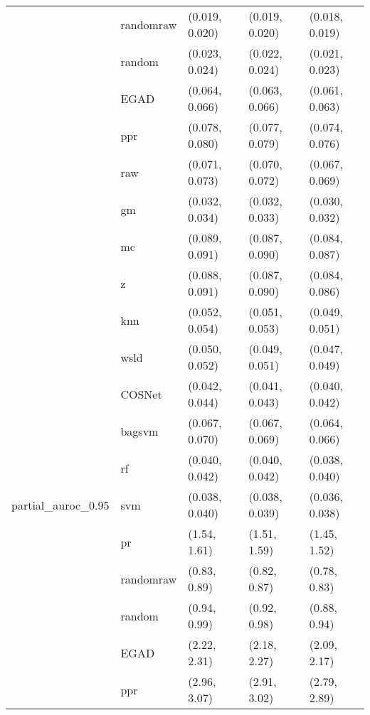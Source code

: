 \begin{table}[H]
{\begin{tabular}{lllll}
 & randomraw & (0.019, 0.020) & (0.019, 0.020) & (0.018, 0.019)\\

 & random & (0.023, 0.024) & (0.022, 0.024) & (0.021, 0.023)\\

 & EGAD & (0.064, 0.066) & (0.063, 0.066) & (0.061, 0.063)\\

 & ppr & (0.078, 0.080) & (0.077, 0.079) & (0.074, 0.076)\\

 & raw & (0.071, 0.073) & (0.070, 0.072) & (0.067, 0.069)\\

 & gm & (0.032, 0.034) & (0.032, 0.033) & (0.030, 0.032)\\

 & mc & (0.089, 0.091) & (0.087, 0.090) & (0.084, 0.087)\\

 & z & (0.088, 0.091) & (0.087, 0.090) & (0.084, 0.086)\\

 & knn & (0.052, 0.054) & (0.051, 0.053) & (0.049, 0.051)\\

 & wsld & (0.050, 0.052) & (0.049, 0.051) & (0.047, 0.049)\\

 & COSNet & (0.042, 0.044) & (0.041, 0.043) & (0.040, 0.042)\\

 & bagsvm & (0.067, 0.070) & (0.067, 0.069) & (0.064, 0.066)\\

 & rf & (0.040, 0.042) & (0.040, 0.042) & (0.038, 0.040)\\

\multirow{-15}{*}{\raggedright\arraybackslash partial\_auroc\_0.95} & svm & (0.038, 0.040) & (0.038, 0.039) & (0.036, 0.038)\\
\cmidrule{1-5}
 & pr & (1.54, 1.61) & (1.51, 1.59) & (1.45, 1.52)\\

 & randomraw & (0.83, 0.89) & (0.82, 0.87) & (0.78, 0.83)\\

 & random & (0.94, 0.99) & (0.92, 0.98) & (0.88, 0.94)\\

 & EGAD & (2.22, 2.31) & (2.18, 2.27) & (2.09, 2.17)\\

 & ppr & (2.96, 3.07) & (2.91, 3.02) & (2.79, 2.89)\\


\end{tabular}}
\end{table}
